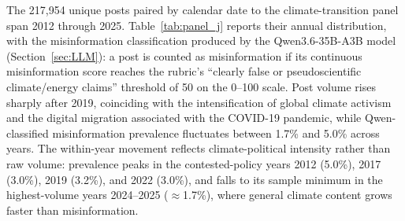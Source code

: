 \documentclass{article}
\theoremstyle{plain}
\begin{document}
The 217,954 unique posts paired by calendar date to the climate-transition panel span 2012 through 2025. Table~\ref{tab:panel_j} reports their annual distribution, with the misinformation classification produced by the Qwen3.6-35B-A3B model (Section~\ref{sec:LLM}): a post is counted as misinformation if its continuous misinformation score reaches the rubric's ``clearly false or pseudoscientific climate/energy claims'' threshold of 50 on the 0--100 scale. Post volume rises sharply after 2019, coinciding with the intensification of global climate activism and the digital migration associated with the COVID-19 pandemic, while Qwen-classified misinformation prevalence fluctuates between 1.7\% and 5.0\% across years. The within-year movement reflects climate-political intensity rather than raw volume: prevalence peaks in the contested-policy years 2012 (5.0\%), 2017 (3.0\%), 2019 (3.2\%), and 2022 (3.0\%), and falls to its sample minimum in the highest-volume years 2024--2025 ($\approx$1.7\%), where general climate content grows faster than misinformation.
\end{document}
